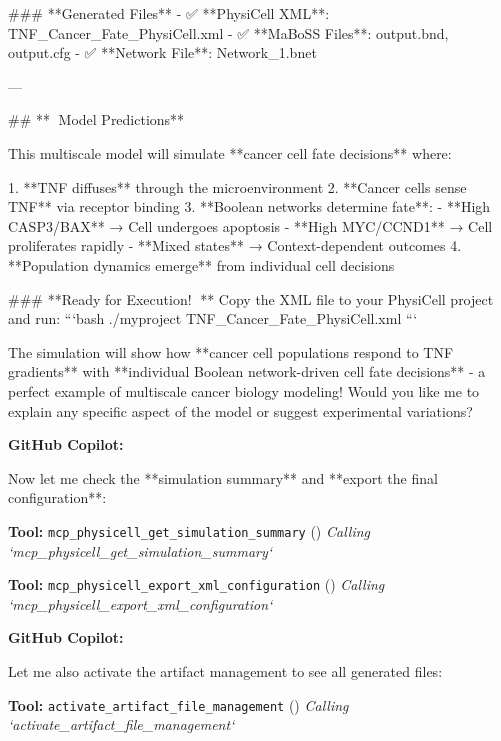 \documentclass[11pt,a4paper]{article}
\begin{document}
\begin{copilotbox}
\#\#\# **Generated Files**
- ✅ **PhysiCell XML**: TNF\_Cancer\_Fate\_PhysiCell.xml
- ✅ **MaBoSS Files**: output.bnd, output.cfg
- ✅ **Network File**: Network\_1.bnet

---

\#\# **🔬 Model Predictions**

This multiscale model will simulate **cancer cell fate decisions** where:

1. **TNF diffuses** through the microenvironment  
2. **Cancer cells sense TNF** via receptor binding
3. **Boolean networks determine fate**:
   - **High CASP3/BAX** → Cell undergoes apoptosis  
   - **High MYC/CCND1** → Cell proliferates rapidly
   - **Mixed states** → Context-dependent outcomes
4. **Population dynamics emerge** from individual cell decisions

\#\#\# **Ready for Execution! 🚀**
Copy the XML file to your PhysiCell project and run:
```bash
./myproject TNF\_Cancer\_Fate\_PhysiCell.xml
```

The simulation will show how **cancer cell populations respond to TNF gradients** with **individual Boolean network-driven cell fate decisions** - a perfect example of multiscale cancer biology modeling! Would you like me to explain any specific aspect of the model or suggest experimental variations?

\end{copilotbox}
\begin{copilotbox}
\textbf{GitHub Copilot:}

Now let me check the **simulation summary** and **export the final configuration**:

\end{copilotbox}
\begin{toolokbox}
\textbf{Tool:} \texttt{mcp\_physicell\_get\_simulation\_summary} (\checkmark)
\textit{Calling `mcp\_physicell\_get\_simulation\_summary`}
\end{toolokbox}
\begin{toolokbox}
\textbf{Tool:} \texttt{mcp\_physicell\_export\_xml\_configuration} (\checkmark)
\textit{Calling `mcp\_physicell\_export\_xml\_configuration`}
\end{toolokbox}
\begin{copilotbox}
\textbf{GitHub Copilot:}

Let me also activate the artifact management to see all generated files:

\end{copilotbox}
\begin{toolokbox}
\textbf{Tool:} \texttt{activate\_artifact\_file\_management} (\checkmark)
\textit{Calling `activate\_artifact\_file\_management`}
\end{toolokbox}
\end{document}
